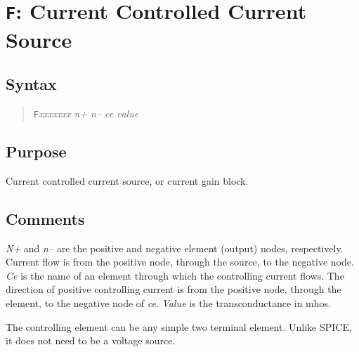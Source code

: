 \section{{\tt F}: Current Controlled Current Source}
\subsection{Syntax}
\begin{verse}
{\tt F}{\it xxxxxxx n+ n-- ce} {\it value}
\end{verse}
\subsection{Purpose}

Current controlled current source, or current gain block.
\subsection{Comments}

{\it N+} and {\it n--} are the positive and negative element (output)
nodes, respectively.  Current flow is from the positive node,
through the source, to the negative node.  {\it Ce} is the name of
an element through which the controlling current flows.  The
direction of positive controlling current is from the positive
node, through the element, to the negative node of {\it ce}.  {\it
Value} is the transconductance in mhos.

The controlling element can be any simple two terminal element.
Unlike SPICE, it does not need to be a voltage source.
